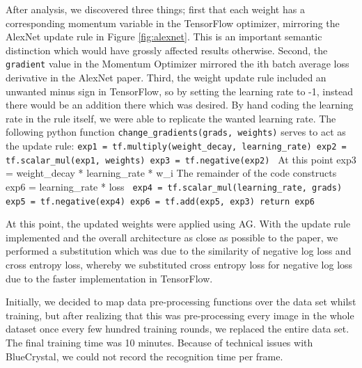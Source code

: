 \documentclass[conference]{IEEEtran}
\begin{document}
After analysis, we discovered three things; first that each weight has a corresponding momentum variable in the TensorFlow optimizer, mirroring the AlexNet update rule in Figure \ref{fig:alexnet}. This is an important semantic distinction which would have grossly affected results otherwise. Second, the \texttt{gradient} value in the Momentum Optimizer mirrored the ith batch average loss derivative in the AlexNet paper. Third, the weight update rule included an unwanted minus sign in TensorFlow, so by setting the learning rate to -1, instead there would be an addition there which was desired. By hand coding the learning rate in the rule itself, we were able to replicate the wanted learning rate. The following python function \texttt{change\_gradients(grads, weights)} serves to act as the update rule:
\newline
\newline
\texttt{exp1 = tf.multiply(weight\_decay, learning\_rate) \newline
    exp2 = tf.scalar\_mul(exp1, weights) \newline
    exp3 = tf.negative(exp2) \newline
    }
    \newline
    At this point exp3 = weight\_decay * learning\_rate * w\_i
    \newline
    The remainder of the code constructs exp6 = learning\_rate * loss
    \newline
    \newline
\texttt{
    exp4 = tf.scalar\_mul(learning\_rate, grads) \newline
    exp5 = tf.negative(exp4) \newline
    exp6 = tf.add(exp5, exp3) \newline
    return exp6 \newline
}

At this point, the updated weights were applied using AG. With the update rule implemented and the overall architecture as close as possible to the paper, we performed a substitution which was due to the similarity of negative log loss and cross entropy loss, whereby we substituted cross entropy loss for negative log loss due to the faster implementation in TensorFlow.

Initially, we decided to map data pre-processing functions over the data set whilst training, but after realizing that this was pre-processing every image in the whole dataset once every few hundred training rounds, we replaced the entire data set. The final training time was 10 minutes. Because of technical issues with BlueCrystal, we could not record the recognition time per frame.
\end{document}
